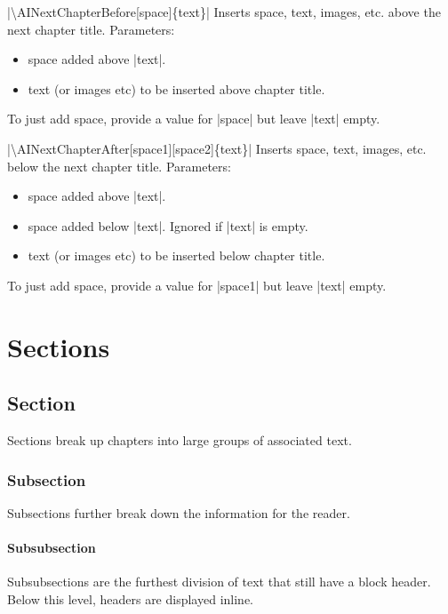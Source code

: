 \documentclass[letterpaper,twocolumn,openany,nodeprecatedcode]{astroinfernobook}
\begin{document}
\newpage %
\begin{AIComment}[unbreakable]{|{\textbackslash}AINextChapterBefore[space]\{text\}|}
  Inserts space, text, images, etc. above the next chapter title. Parameters:
  \begin{itemize}[leftmargin=1.3cm]
  \item[|space|] space added above |text|.
  \item[|text|] text (or images etc) to be inserted above chapter title.
  \end{itemize}
  To just add space, provide a value for |space| but leave |text| empty.
\end{AIComment}
\vspace{0.45cm} %
\begin{AIComment}[unbreakable]{|{\textbackslash}AINextChapterAfter[space1][space2]\{text\}|}
  Inserts space, text, images, etc. below the next chapter title. Parameters:
  \begin{itemize}[leftmargin=1.3cm]
  \item[|space1|] space added above |text|.
  \item[|space2|] space added below |text|. Ignored if |text| is empty.
  \item[|text|] text (or images etc) to be inserted below chapter title.
  \end{itemize}
  To just add space, provide a value for |space1| but leave |text| empty.
\end{AIComment}

\chapter{Sections}

\section{Section}
Sections break up chapters into large groups of associated text.

\subsection{Subsection}
Subsections further break down the information for the reader.

\subsubsection{Subsubsection}
Subsubsections are the furthest division of text that still have a block header. Below this level, headers are displayed inline.
\end{document}
